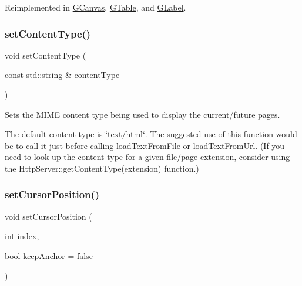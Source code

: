 Reimplemented in \mbox{\hyperlink{classGCanvas_a56845b1accc47aa881d05939eef6996c}{G\+Canvas}}, \mbox{\hyperlink{classGTable_a56845b1accc47aa881d05939eef6996c}{G\+Table}}, and \mbox{\hyperlink{classGLabel_a56845b1accc47aa881d05939eef6996c}{G\+Label}}.

\mbox{\label{classGBrowserPane_a0ba11f3ad4f6257759f0db3dd791e6a4}} 
\subsubsection{\texorpdfstring{set\+Content\+Type()}{setContentType()}}
{\footnotesize\ttfamily void set\+Content\+Type (\begin{DoxyParamCaption}\item[{const std\+::string \&}]{content\+Type }\end{DoxyParamCaption})\hspace{0.3cm}{\ttfamily [virtual]}}



Sets the M\+I\+ME content type being used to display the current/future pages. 

The default content type is \char`\"{}text/html\char`\"{}. The suggested use of this function would be to call it just before calling load\+Text\+From\+File or load\+Text\+From\+Url. (If you need to look up the content type for a given file/page extension, consider using the Http\+Server\+::get\+Content\+Type(extension) function.) \mbox{\label{classGBrowserPane_a5817e10a86be5cd41b3668d8fccb10e0}} 
\subsubsection{\texorpdfstring{set\+Cursor\+Position()}{setCursorPosition()}}
{\footnotesize\ttfamily void set\+Cursor\+Position (\begin{DoxyParamCaption}\item[{int}]{index,  }\item[{bool}]{keep\+Anchor = {\ttfamily false} }\end{DoxyParamCaption})\hspace{0.3cm}{\ttfamily [virtual]}}



